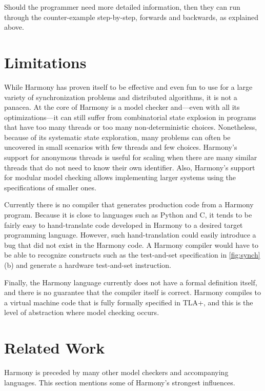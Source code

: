 \documentclass[twocolumn]{article}
\begin{document}
Should the programmer need more detailed information, then they can
run through the counter-example step-by-step, forwards and backwards,
as explained above.

\section{Limitations}

While Harmony has proven itself to be effective and even fun to use
for a large variety of synchronization problems and distributed
algorithms, it is not a panacea.  At the core of Harmony is a model
checker and---even with all its optimizations---it can still suffer
from combinatorial state explosion in programs that have too many
threads or too many non-deterministic choices.  Nonetheless, because
of its systematic state exploration, many problems can often be
uncovered in small scenarios with few threads and few choices.
Harmony's support for anonymous threads is useful for scaling when
there are many similar threads that do not need to know their own
identifier.  Also, Harmony's support for modular model checking
allows implementing larger systems using the specifications of smaller ones.

Currently there is no compiler that generates production code from
a Harmony program.
Because it is close to languages such as Python and C, it tends to be fairly
easy to hand-translate code developed in Harmony to a desired target
programming language.  However, such hand-translation could easily
introduce a bug that did not exist in the Harmony code.
A Harmony compiler would have to be able to recognize constructs such as
the test-and-set specification in \autoref{fig:synch}(b) and generate
a hardware test-and-set instruction.

Finally, the Harmony language currently does not have a formal definition
itself, and there is no guarantee that the compiler itself is correct.
Harmony compiles to a virtual machine code that is fully formally
specified in TLA+, and this is the level of abstraction where model
checking occurs.

\section{Related Work}

Harmony is preceded by many other model checkers and accompanying
languages.  This section mentions some of Harmony's strongest influences.
\end{document}

